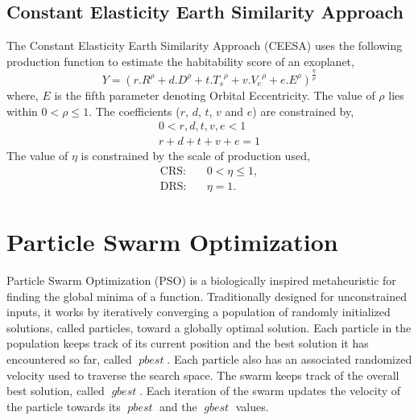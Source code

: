 \documentclass[10pt]{article}
\DeclareMathOperator*{\pbest}{\mathit{pbest}}
\DeclareMathOperator*{\gbest}{\mathit{gbest}}
\begin{document}
\subsection{Constant Elasticity Earth Similarity Approach}\label{subsec:ceesa}
The Constant Elasticity Earth Similarity Approach (CEESA) uses the following production function to estimate the
habitability score of an exoplanet,
\begin{equation}\label{eq:ceesa}
  Y = {(r.R^\rho+d.D^\rho+t.{T_s}^\rho+v.{V_e}^\rho+e.E^\rho)}^{\frac{\eta}{\rho}}
\end{equation}
where, $E$ is the fifth parameter denoting Orbital Eccentricity. The value of $\rho$ lies within $0<\rho\leq 1$.
The coefficients ($r$, $d$, $t$, $v$ and $e$) are constrained by,
\begin{subequations}
  \begin{align}
      0 < r,d,t,v,e < 1\\
      r+d+t+v+e = 1
  \end{align}
\end{subequations}
The value of $\eta$ is constrained by the scale of production used,
\begin{subequations}
  \begin{alignat}{3}
    \text{CRS:} & \quad 0 < \eta \leq 1,\\
    \text{DRS:} & \quad \eta = 1.
  \end{alignat}
\end{subequations}


\section{Particle Swarm Optimization}\label{sec:pso}

Particle Swarm Optimization (PSO) is a biologically inspired metaheuristic for finding the global minima of a function.
Traditionally designed for unconstrained inputs, it works by iteratively converging a population of randomly initialized
solutions, called particles, toward a globally optimal solution. Each particle in the population keeps track of its
current position and the best solution it has encountered so far, called $\pbest$. Each particle also has an associated
randomized velocity used to traverse the search space. The swarm keeps track of the overall best solution, called
$\gbest$. Each iteration of the swarm updates the velocity of the particle towards its $\pbest$ and the $\gbest$ values.
\end{document}
